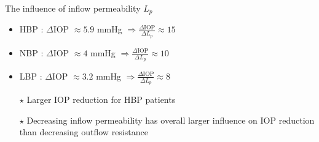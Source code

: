 \begin{frame}{The influence of inflow permeability $L_p$}
\begin{itemize}
\item \alert{HBP }: $\Delta$IOP $\approx 5.9$ mmHg
$\Rightarrow\frac{\Delta \mathrm{IOP}}{\Delta L_p} \approx 15$
\medskip

\item \alert{NBP }: $\Delta$IOP $\approx 4$ mmHg
$\Rightarrow
\frac{\Delta \mathrm{IOP}}{\Delta L_p} \approx 10$
\medskip
\item \alert{LBP }: $\Delta$IOP $\approx 3.2$ mmHg
$\Rightarrow
\frac{\Delta \mathrm{IOP}}{\Delta L_p} \approx 8$
\end{itemize}
\bigskip
\begin{itemize}
\item[$\star$] Larger IOP reduction for HBP patients
\medskip
\item[$\star$] Decreasing inflow permeability has overall larger influence on IOP reduction than decreasing outflow resistance
\end{itemize}
\end{frame}

%
